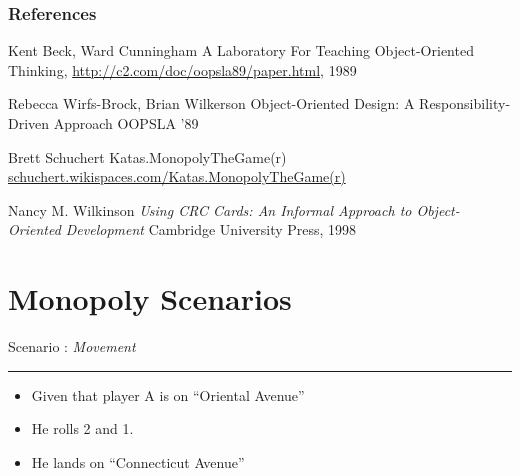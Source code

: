 \documentclass[handout,t,12pt]{beamer}
\newcommand{\Square}[1]{``#1''}
\newcounter{scenarioid}\setcounter{scenarioid}{0}
\newenvironment{scenario}[1]{%
\addtocounter{scenarioid}{1} 
{\Large Scenario \thescenarioid: \emph{#1}\\[3px]\hrule}
\vspace{1\bigskipamount}
}{%
}
\begin{document}
  \begin{frame}\frametitle{References}
      \begin{thebibliography}{10}
        
          Kent Beck, Ward Cunningham
          \newblock A Laboratory For Teaching Object-Oriented Thinking,
          \newblock \url{http://c2.com/doc/oopsla89/paper.html}, 1989

          Rebecca Wirfs-Brock, Brian Wilkerson
          \newblock Object-Oriented Design: A Responsibility-Driven Approach
          \newblock OOPSLA '89
          
          Brett Schuchert
          \newblock Katas.MonopolyTheGame(r)
          \newblock \url{schuchert.wikispaces.com/Katas.MonopolyTheGame(r)}

          Nancy M. Wilkinson
          \newblock \emph{Using CRC Cards: An Informal Approach to Object-Oriented Development}
          \newblock Cambridge University Press, 1998
        
        
    \end{thebibliography}
  \end{frame}

  \section{Monopoly Scenarios}  
  
  \begin{frame}
    \begin{scenario}{Movement}
      \begin{itemize}
        \item Given that player A is on \Square{Oriental Avenue}
        \item He rolls 2 and 1.  
        \item He lands on \Square{Connecticut Avenue}
      \end{itemize}      
    \end{scenario}
  \end{frame}
\end{document}
